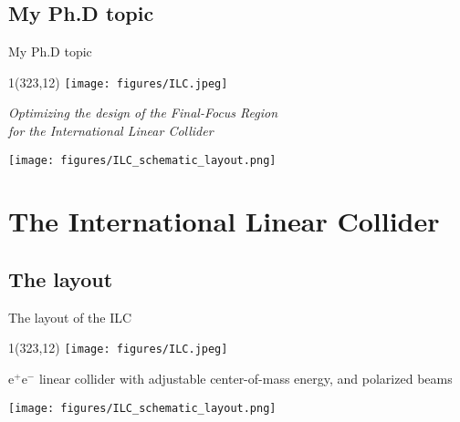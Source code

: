 \documentclass[xcolor={dvipsnames}]{beamer}
\newcommand{\ilclogo}{
  \setlength{\TPHorizModule}{1pt}
  \setlength{\TPVertModule}{1pt}
  \begin{textblock}{1}(323,12)
   \texttt{[image: figures/ILC.jpeg]}
  \end{textblock}
}
\begin{document}
\subsection{My Ph.D topic}
\begin{frame}{My Ph.D topic}
\ilclogo
\begin{center}
\begin{block}{}
\centering
\textit{Optimizing the design of the Final-Focus Region\\for the International Linear Collider}
\end{block}
\vspace*{0.2cm}
\texttt{[image: figures/ILC\_schematic\_layout.png]}
\end{center}
\end{frame}

\section{The International Linear Collider}

\subsection{The layout}
\begin{frame}{The layout of the ILC}
\ilclogo

e$^+$e$^-$ linear collider with adjustable center-of-mass energy, and polarized beams\\
\begin{center}
\texttt{[image: figures/ILC\_schematic\_layout.png]}
\end{center}
\end{frame}
\end{document}
